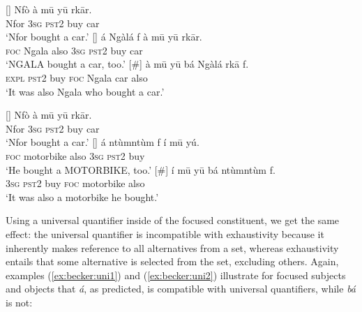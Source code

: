 \documentclass[output=paper,
modfonts
]{langscibook}
\begin{document}
\begin{exe}
\ex
\begin{xlist}
[] {{\label{ex:becker:also1}}
\gll Nf\`o \`a m\=u y\=u rk\=ar. \\
Nfor \textsc{3sg} \textsc{pst2} buy car\\
\glt `Nfor bought a car.'}
[]{ \label{ex:becker:also2}
\gll \'a Ng\`al\'a  f \`a m\=u y\=u rk\=ar. \\
\textsc{foc} Ngala also \textsc{3sg} \textsc{pst2} buy car  \\
\glt `NGALA bought a car, too.'}
[\#] {\label{ex:becker:also3}
\gll \`a m\=u y\=u {b\'a} Ng\`al\'a rk\=a f. \\
 \textsc{expl} \textsc{pst2} buy \textsc{foc} Ngala car also\\
\glt `It was also Ngala who bought a car.'}
\end{xlist}
\end{exe}



\begin{exe}
\ex
\begin{xlist}
[] {\label{ex:becker:also4} 
\gll Nf\`o \`a m\=u y\=u rk\=ar. \\
Nfor \textsc{3sg} \textsc{pst2} buy car\\
\glt `Nfor bought a car.'}
[]{ \label{ex:becker:also5}
\gll \'a nt\`umnt\`um  f \'i m\=u y\'u. \\
\textsc{foc} motorbike also \textsc{3sg} \textsc{pst2} buy  \\
\glt `He bought a MOTORBIKE, too.'}
[\#] {\label{ex:becker:also6}
\gll \'i m\=u y\=u {b\'a} nt\`umnt\`um f. \\
 \textsc{3sg} \textsc{pst2} buy \textsc{foc} motorbike also\\
\glt `It was also a motorbike he bought.'}
\end{xlist}
\end{exe}
Using a universal quantifier inside of the focused constituent, we get the same effect: the universal quantifier is incompatible with exhaustivity because it inherently makes reference to all alternatives from a set, whereas exhaustivity entails that some alternative is selected from the set, excluding others. Again, examples (\ref{ex:becker:uni1}) and (\ref{ex:becker:uni2})  illustrate for focused subjects and objects that \textit{á}, as predicted, is compatible with universal quantifiers, while \textit{bá} is not:
\end{document}
